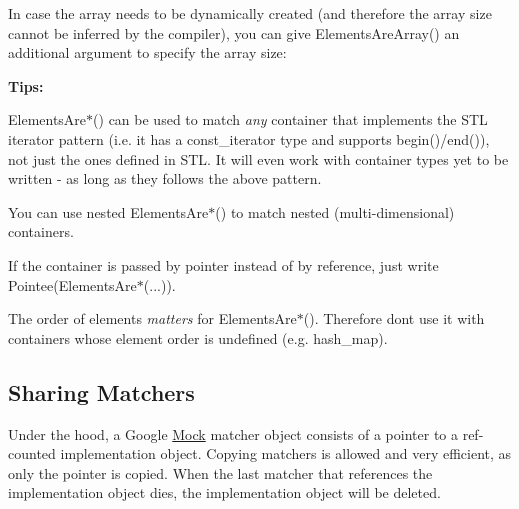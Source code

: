 In case the array needs to be dynamically created (and therefore the array size cannot be inferred by the compiler), you can give {\ttfamily Elements\+Are\+Array()} an additional argument to specify the array size\+:


\begin{DoxyCode}{0}
\end{DoxyCode}


{\bfseries{Tips\+:}}


\begin{DoxyItemize}
\item {\ttfamily Elements\+Are$\ast$()} can be used to match {\itshape any} container that implements the S\+TL iterator pattern (i.\+e. it has a {\ttfamily const\+\_\+iterator} type and supports {\ttfamily begin()/end()}), not just the ones defined in S\+TL. It will even work with container types yet to be written -\/ as long as they follows the above pattern.
\item You can use nested {\ttfamily Elements\+Are$\ast$()} to match nested (multi-\/dimensional) containers.
\item If the container is passed by pointer instead of by reference, just write {\ttfamily Pointee(\+Elements\+Are$\ast$(...))}.
\item The order of elements {\itshape matters} for {\ttfamily Elements\+Are$\ast$()}. Therefore don\textquotesingle{}t use it with containers whose element order is undefined (e.\+g. {\ttfamily hash\+\_\+map}).
\end{DoxyItemize}

\subsection*{Sharing Matchers}

Under the hood, a Google \mbox{\hyperlink{class_mock}{Mock}} matcher object consists of a pointer to a ref-\/counted implementation object. Copying matchers is allowed and very efficient, as only the pointer is copied. When the last matcher that references the implementation object dies, the implementation object will be deleted.

